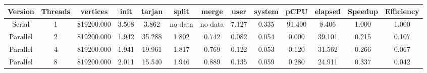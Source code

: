 \begin{tabular}{|c|c|c|c|c|c|c|c|c|c|c|c|c|}
\toprule
 Version &  Threads &   vertices &  init &  tarjan &   split &   merge &  user &  system &   pCPU &  elapsed &  Speedup &  Efficiency \\
\midrule
  Serial &        1 & 819200.000 & 3.508 &   3.862 & no data & no data & 7.127 &   0.335 & 91.400 &    8.406 &    1.000 &       1.000 \\
Parallel &        2 & 819200.000 & 1.942 &  35.288 &   1.802 &   0.742 & 0.082 &   0.054 &  0.000 &   39.101 &    0.215 &       0.107 \\
Parallel &        4 & 819200.000 & 1.941 &  19.961 &   1.817 &   0.769 & 0.122 &   0.053 &  0.120 &   31.562 &    0.266 &       0.067 \\
Parallel &        8 & 819200.000 & 2.011 &  15.540 &   1.946 &   0.889 & 0.135 &   0.059 &  0.280 &   24.911 &    0.337 &       0.042 \\
\bottomrule
\end{tabular}
